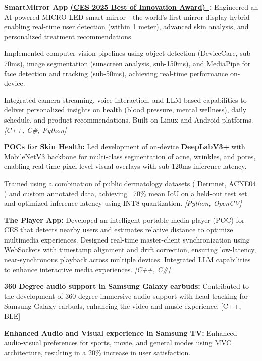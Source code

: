 \documentclass[letterpaper,10 pt]{article}
\newcommand{\externalLink}[2]{\href{#1}{#2\ \faExternalLink}}
\newcommand{\resumeItem}[1]{\item\small{{#1 \vspace{-2pt}}}}
\begin{document}
\resumeItem{\textbf{SmartMirror App \externalLink{https://www.ces.tech/ces-innovation-awards/2025/micro-led-beauty-mirror/}{(CES 2025 Best of Innovation Award)}:} Engineered an AI-powered MICRO LED smart mirror—the world’s first mirror-display hybrid—enabling real-time user detection (within 1 meter), advanced skin analysis, and personalized treatment recommendations.}

\resumeItem{Implemented computer vision pipelines using object detection (DeviceCare, sub-70ms), image segmentation (sunscreen analysis, sub-150ms), and MediaPipe for face detection and tracking (sub-50ms), achieving real-time performance on-device.}

\resumeItem{Integrated camera streaming, voice interaction, and LLM-based capabilities to deliver personalized insights on health (blood pressure, mental wellness), daily schedule, and product recommendations. Built on Linux and Android platforms.  \textit{[C++, C\#, Python]}}

\resumeItem{\textbf{POCs for Skin Health:} Led development of on-device \textbf{DeepLabV3+} with MobileNetV3 backbone for multi-class segmentation of acne, wrinkles, and pores, enabling real-time pixel-level visual overlays with sub-120ms inference latency.}

\resumeItem{Trained using a combination of public dermatology datasets ( Dermnet, ACNE04 ) and custom annotated data, achieving ~70\% mean IoU on a held-out test set and optimized inference latency using INT8 quantization. \hfill \textit{[Python, OpenCV]}}

\resumeItem{\textbf{The Player App:} Developed an intelligent portable media player (POC) for CES that detects nearby users and estimates relative distance to optimize multimedia experiences. Designed real-time master-client synchronization using WebSockets with timestamp alignment and drift correction, ensuring low-latency, near-synchronous playback across multiple devices. Integrated LLM capabilities to enhance interactive media experiences. \hfill \textit{[C++, C\#]}}
\resumeItem{\textbf{360 Degree audio support in Samsung Galaxy earbuds:} Contributed to the development of 360 degree immersive audio support with head tracking for Samsung Galaxy earbuds, enhancing the video and music experience. [C++, BLE]}

\resumeItem{\textbf{Enhanced Audio and Visual experience in Samsung TV:} Enhanced audio-visual preferences for sports, movie, and general modes using MVC architecture, resulting in a 20\% increase in user satisfaction.}
\end{document}
